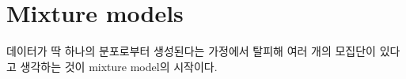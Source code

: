 \documentclass[a4paper, 10pt]{book}
\begin{document}
\section{Mixture models}
  데이터가 딱 하나의 분포로부터 생성된다는 가정에서 탈피해 여러 개의 모집단이 있다고 생각하는 것이 mixture model의 시작이다. 
\end{document}

